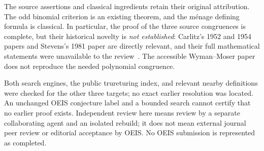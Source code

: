 \documentclass[11pt]{article}
\begin{document}
The source assertions and classical ingredients retain their original
attribution. The odd binomial criterion is an existing theorem, and the
m\'enage defining formula is classical. In particular, the proof of the
three source congruences is complete, but their historical novelty is
\emph{not established}: Carlitz's 1952 and 1954 papers and Stevens's 1981
paper are directly relevant, and their full mathematical statements were
unavailable to the review~\cite{Carlitz1952,Carlitz1954,Stevens1981}.
The accessible Wyman--Moser paper~\cite{WymanMoser1958} does not reproduce
the needed polynomial congruence.

Both search engines, the public trureturing index, and relevant nearby
definitions were checked for the other three targets; no exact earlier
resolution was located. An unchanged OEIS conjecture label and a bounded
search cannot certify that no earlier proof exists. Independent review
here means review by a separate collaborating agent and an isolated
rebuild; it does not mean external journal peer review or editorial
acceptance by OEIS. No OEIS submission is represented as completed.
\end{document}
